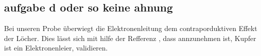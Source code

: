 \subsection{aufgabe d oder so keine ahnung}


%
%

Bei unseren Probe überwiegt die Elektronenleitung dem contraporduktiven Effekt der Löcher.
Dies lässt sich mit hilfe der Refferenz \cite[8]{V311.pdf}, dass annzunehmen ist, Kupfer ist ein Elektronenleier, validieren.